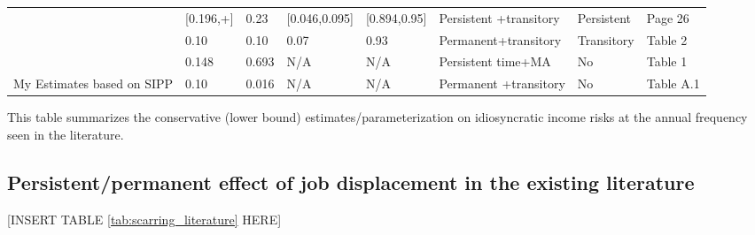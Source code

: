 \begin{sidewaystable}[p]
\begin{adjustbox}{width={\textwidth}}
\begin{threeparttable}
\begin{tabular}{llllllll}
\cite{krueger2016macroeconomics} & [0.196,+]      & 0.23            & [0.046,0.095] & [0.894,0.95] & Persistent +transitory                 & Persistent   & Page 26   \\
\cite{carroll2017distribution}   & 0.10           & 0.10            & 0.07          & 0.93         & Permanent+transitory                   & Transitory   & Table 2   \\
\cite{bayer2019precautionary}    & 0.148          & 0.693           & N/A           & N/A          & Persistent time+MA                     & No           & Table 1   \\
My Estimates based on SIPP       & 0.10           & 0.016           & N/A           & N/A          & Permanent +transitory                  & No           & Table A.1\\
\hline
\hline 
\end{tabular} 
	\begin{flushleft}
\item This table summarizes the  conservative (lower bound) estimates/parameterization on idiosyncratic income risks at the annual frequency seen in the literature.    \end{flushleft}
\end{threeparttable}
\end{adjustbox}
	\end{sidewaystable}
	
	
	

\subsection{Persistent/permanent effect of job displacement in the existing literature}

\begin{center}
[INSERT TABLE \ref{tab:scarring_literature} HERE]  
\end{center}

